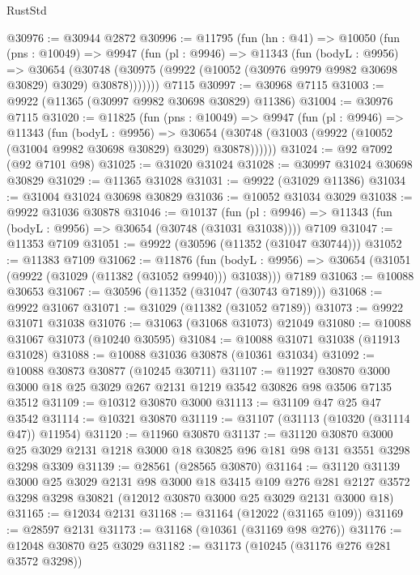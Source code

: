 \begin{lexlean}{RustStd}
\begin{coremodule}
@30976 := @30944 @2872
@30996 := @11795
    (fun (hn : @41) =>
    @10050
      (fun (pns : @10049) =>
      @9947
        (fun (pl : @9946) =>
        @11343
          (fun (bodyL : @9956) =>
          @30654
            (@30748 (@30975 (@9922 (@10052 (@30976 @9979 @9982 @30698 @30829) @3029) @30878)))))))
    @7115
@30997 := @30968 @7115
@31003 := @9922 (@11365 (@30997 @9982 @30698 @30829) @11386)
@31004 := @30976 @7115
@31020 := @11825
    (fun (pns : @10049) =>
    @9947
      (fun (pl : @9946) =>
      @11343
        (fun (bodyL : @9956) =>
        @30654 (@30748 (@31003 (@9922 (@10052 (@31004 @9982 @30698 @30829) @3029) @30878))))))
@31024 := @92 @7092 (@92 @7101 @98)
@31025 := @31020 @31024
@31028 := @30997 @31024 @30698 @30829
@31029 := @11365 @31028
@31031 := @9922 (@31029 @11386)
@31034 := @31004 @31024 @30698 @30829
@31036 := @10052 @31034 @3029
@31038 := @9922 @31036 @30878
@31046 := @10137
    (fun (pl : @9946) => @11343 (fun (bodyL : @9956) => @30654 (@30748 (@31031 @31038))))
    @7109
@31047 := @11353 @7109
@31051 := @9922 (@30596 (@11352 (@31047 @30744)))
@31052 := @11383 @7109
@31062 := @11876
    (fun (bodyL : @9956) => @30654 (@31051 (@9922 (@31029 (@11382 (@31052 @9940))) @31038)))
    @7189
@31063 := @10088 @30653
@31067 := @30596 (@11352 (@31047 (@30743 @7189)))
@31068 := @9922 @31067
@31071 := @31029 (@11382 (@31052 @7189))
@31073 := @9922 @31071 @31038
@31076 := @31063 (@31068 @31073) @21049
@31080 := @10088 @31067 @31073 (@10240 @30595)
@31084 := @10088 @31071 @31038 (@11913 @31028)
@31088 := @10088 @31036 @30878 (@10361 @31034)
@31092 := @10088 @30873 @30877 (@10245 @30711)
@31107 := @11927
    @30870
    @3000
    @3000
    @18
    @25
    @3029
    @267
    @2131
    @1219
    @3542
    @30826
    @98
    @3506
    @7135
    @3512
@31109 := @10312 @30870 @3000
@31113 := @31109 @47 @25 @47 @3542
@31114 := @10321 @30870
@31119 := @31107 (@31113 (@10320 (@31114 @47)) @11954)
@31120 := @11960 @30870
@31137 := @31120
    @30870
    @3000
    @25
    @3029
    @2131
    @1218
    @3000
    @18
    @30825
    @96
    @181
    @98
    @131
    @3551
    @3298
    @3298
    @3309
@31139 := @28561 (@28565 @30870)
@31164 := @31120
    @31139
    @3000
    @25
    @3029
    @2131
    @98
    @3000
    @18
    @3415
    @109
    @276
    @281
    @2127
    @3572
    @3298
    @3298
    @30821
    (@12012 @30870 @3000 @25 @3029 @2131 @3000 @18)
@31165 := @12034 @2131
@31168 := @31164 (@12022 (@31165 @109))
@31169 := @28597 @2131
@31173 := @31168 (@10361 (@31169 @98 @276))
@31176 := @12048 @30870 @25 @3029
@31182 := @31173 (@10245 (@31176 @276 @281 @3572 @3298))

\end{coremodule}
\end{lexlean}

